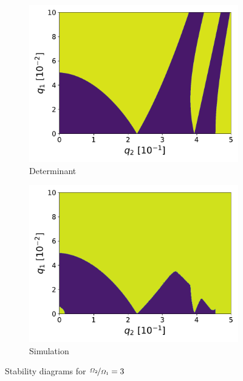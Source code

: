 \begin{figure}[H]
\begin{subfigure}{.5\textwidth}
  \centering
  \includegraphics[width=\linewidth]{img/det_q1_0.0-0.1_q2_0.0-0.5_990x990_3.pdf}
  \caption{Determinant}
  \label{fig:det_3}
\end{subfigure}%
\begin{subfigure}{.5\textwidth}
  \centering
  \includegraphics[width=\linewidth]{img/0_ions_1_electrons_q1_0.0-0.1_q2_0.0-0.5_488x488_3.pdf}  
  \caption{Simulation}
  \label{fig:sim_3}
\end{subfigure}
\caption{Stability diagrams for $\nicefrac{\Omega_2}{\Omega_1} = 3$}
\label{fig:stabil-eta=3}
\end{figure}

